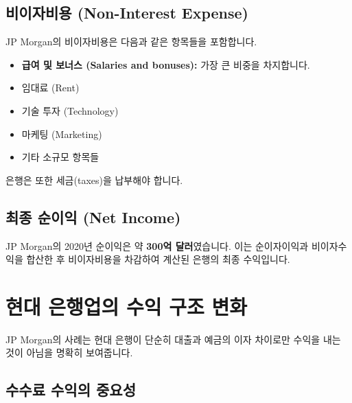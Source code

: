 \documentclass[11pt,a4paper]{article}
\theoremstyle{definition}
\begin{document}
\subsection{비이자비용 (Non-Interest Expense)}

JP Morgan의 비이자비용은 다음과 같은 항목들을 포함합니다.

\begin{itemize}
    \item \textbf{급여 및 보너스 (Salaries and bonuses):} 가장 큰 비중을 차지합니다.
    \item 임대료 (Rent)
    \item 기술 투자 (Technology)
    \item 마케팅 (Marketing)
    \item 기타 소규모 항목들
\end{itemize}
은행은 또한 세금(taxes)을 납부해야 합니다.

\subsection{최종 순이익 (Net Income)}

JP Morgan의 2020년 순이익은 약 \textbf{300억 달러}였습니다. 이는 순이자이익과 비이자수익을 합산한 후 비이자비용을 차감하여 계산된 은행의 최종 수익입니다.

\newpage
\section{현대 은행업의 수익 구조 변화}

JP Morgan의 사례는 현대 은행이 단순히 대출과 예금의 이자 차이로만 수익을 내는 것이 아님을 명확히 보여줍니다.

\subsection{수수료 수익의 중요성}
\end{document}
